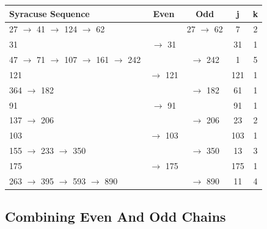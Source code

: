 \documentclass[preprint,natbib]{sigplanconf}
\begin{document}
\noindent
\begin{minipage}{\columnwidth}
    \setlength{\tabcolsep}{.35\tabcolsep}
    \centering
    \begin{tabular}{|l|c|c|c|c|}
        \hline
        \textbf{Syracuse Sequence}                      & \textbf{Even} & \textbf{Odd} & \textbf{j} & \textbf{k}  \\
        \hline
        27 $\to$ 41 $\to$ 124 $\to$ 62                  &               & 27 $\to$ 62  & 7          & 2           \\
        \hline
        31                                        & $\to$ 31      &              & 31         & 1               \\
        \hline
        47 $\to$ 71 $\to$ 107 $\to$ 161 $\to$ 242 &               & $\to$ 242    & 1          & 5            \\
        \hline
        121                                       & $\to$ 121     &              & 121        & 1           \\
        \hline
        364 $\to$ 182                             &               & $\to$ 182    & 61         & 1            \\
        \hline
        91                                        & $\to$ 91      &              & 91         & 1         \\
        \hline
        137 $\to$ 206                             &               & $\to$ 206    & 23         & 2              \\
        \hline
         103                                       & $\to$ 103     &              & 103        & 1             \\
        \hline
        155 $\to$ 233 $\to$ 350                   &               & $\to$ 350    & 13         & 3           \\
        \hline
        175                                       & $\to$ 175     &              & 175        & 1            \\
        \hline
        263 $\to$ 395 $\to$ 593 $\to$ 890         &               & $\to$ 890    & 11         & 4         \\
        \hline
    \end{tabular}
\end{minipage}

\subsection{Combining Even And Odd Chains}
\end{document}
